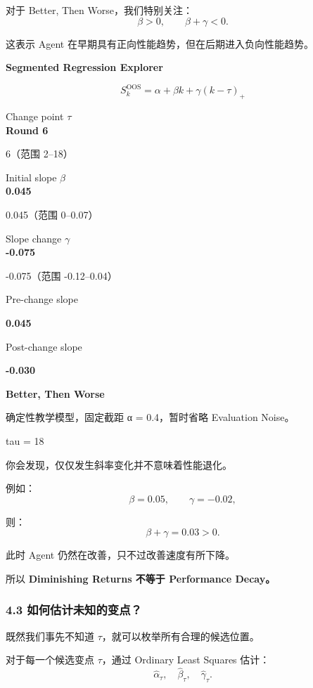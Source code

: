 对于 Better, Then Worse，我们特别关注：
\[\boxed{
\beta>0,
\qquad
\beta+\gamma<0.
}\]

这表示 Agent 在早期具有正向性能趋势，但在后期进入负向性能趋势。

\textbf{Segmented Regression Explorer}

\[S_k^{\mathrm{OOS}}=\alpha+\beta k+\gamma(k-\tau)_+\]

Change point \(\tau\)\\
\textbf{Round 6}

6（范围 2--18）

Initial slope \(\beta\)\\
\textbf{0.045}

0.045（范围 0--0.07）

Slope change \(\gamma\)\\
\textbf{-0.075}

-0.075（范围 -0.12--0.04）


Pre-change slope

\textbf{0.045}

Post-change slope

\textbf{-0.030}

\textbf{Better, Then Worse}

确定性教学模型，固定截距 α = 0.4，暂时省略 Evaluation Noise。

tau = 18


你会发现，仅仅发生斜率变化并不意味着性能退化。

例如：
\[\beta=0.05,\qquad\gamma=-0.02,\]

则：
\[\beta+\gamma=0.03>0.\]

此时 Agent 仍然在改善，只不过改善速度有所下降。

所以 \textbf{Diminishing Returns 不等于 Performance Decay。}

\hypertarget{part-3-48-0001-ux5982ux4f55ux4f30ux8ba1ux672aux77e5ux7684ux53d8ux70b9}{%
\subsubsection{4.3 如何估计未知的变点？}\label{part-3-48-0001-ux5982ux4f55ux4f30ux8ba1ux672aux77e5ux7684ux53d8ux70b9}}

既然我们事先不知道 \(\tau\)，就可以枚举所有合理的候选位置。

对于每一个候选变点 \(\tau\)，通过 Ordinary Least Squares 估计：
\[\hat\alpha_\tau,\quad
\hat\beta_\tau,\quad
\hat\gamma_\tau.\]

